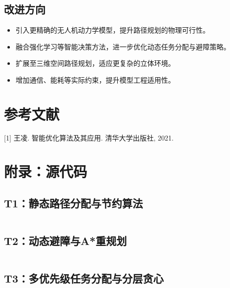 \documentclass[12pt,fontset=adobe]{ctexart}
\begin{document}
\subsection{改进方向}
\begin{itemize}
  \item 引入更精确的无人机动力学模型，提升路径规划的物理可行性。
  \item 融合强化学习等智能决策方法，进一步优化动态任务分配与避障策略。
  \item 扩展至三维空间路径规划，适应更复杂的立体环境。
  \item 增加通信、能耗等实际约束，提升模型工程适用性。
\end{itemize}

\section{参考文献}
[1] 王凌. 智能优化算法及其应用. 清华大学出版社, 2021.  \\

\section*{附录：源代码}

\subsection*{T1：静态路径分配与节约算法}

\inputminted[fontsize=\scriptsize]{python3}{../VRP/T1.py}

\subsection*{T2：动态避障与A*重规划}
\inputminted[fontsize=\scriptsize]{python3}{../VRP/T2.py}

\subsection*{T3：多优先级任务分配与分层贪心}
\inputminted[fontsize=\scriptsize]{python3}{../VRP/T3.py}
\end{document}
